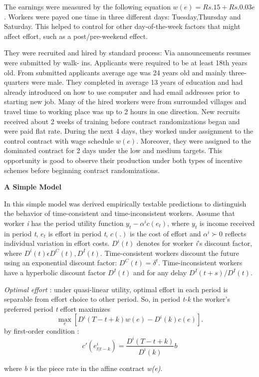 \documentclass[a4paper,12pt]{article}
\begin{document}
The earnings were measured by the following equation $w(e) = Rs.15 + Rs.0.03e$. Workers were payed one time in three different days: Tuesday,Thursday and Saturday. This helped to control for other day-of-the-week factors that might affect effort, such as a post/pre-weekend effect.   

They were recruited and hired by standard process:  Via announcements resumes were submitted by walk- ins. Applicants were required to be at least 18th years old. From submitted applicants average age was 24 years old and mainly three-quarters were male. They completed in average 13 years of education and had already introduced on how to use computer and had email addresses prior to starting new job. Many of the hired workers were from surrounded villages and travel time to working place was up to 2 hours in one direction. New recruits received about 2 weeks of training before contract randomizations began and were paid flat rate. During the next 4 days, they worked under assignment to the control contract with wage schedule $w(e)$. Moreover, they were assigned to the dominated contract for 2 days under the low and medium targets. This opportunity is good to observe their production under both types of incentive schemes before beginning contract randomizations. 

\textbf{A Simple Model}


In this simple model was derived empirically testable predictions to distinguish the behavior of time-consistent and time-inconsistent workers. Assume that worker \textit{i} has the period utility function $y_t-\alpha^i c(e_t)$, where $y_t$ is income received in period \textit{t}, $e_t$ is effort in period \textit{t}, $c(.)$ is the cost of effort and $\alpha^i \succ 0$ reflects individual variation in effort costs. $D^i(t)$ denotes for worker \textit{i}'s discount factor, where $D^i(t)  \epsilon  {D^C(t),D^I(t)}$. Time-consistent workers discount the future using an exponential discount factor: $D^C(t)=\delta^t$. Time-inconsistent workers have a hyperbolic discount factor $D^I(t)$ and for any delay $D^I(t+s)/D^I(t)$. 

\textit{Optimal effort} : under quasi-linear utility, optimal effort in each period is separable from effort choice to other period. So, in period \textit{t-k} the worker's preferred period \textit{t} effort maximizes $$\max_{e}[D^i(T-t+k)w(e)-D^i(k)c(e)].$$
by first-order condition :$$c\prime(e^i_{t|t-k})=\frac{D^i(T-t+k)}{D^i(k)}b$$

where \textit{b} is the piece rate in the affine contract \textit{w(e)}. 
\end{document}

